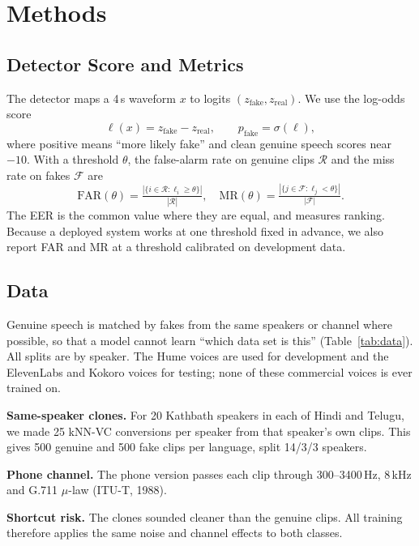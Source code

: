 \documentclass[10pt,a4paper,twocolumn]{article}
\newcommand{\llr}{\ell}
\begin{document}
\section{Methods}
\subsection{Detector Score and Metrics}
The detector maps a 4\,s waveform $x$ to logits $(z_{\text{fake}},z_{\text{real}})$. We use the log-odds score
\begin{equation}
\llr(x)=z_{\text{fake}}-z_{\text{real}},\qquad p_{\text{fake}}=\sigma(\llr),
\label{eq:llr}
\end{equation}
where positive means ``more likely fake'' and clean genuine speech scores near $-10$. With a threshold $\theta$, the false-alarm rate on genuine clips $\mathcal{R}$ and the miss rate on fakes $\mathcal{F}$ are
\begin{equation}
\mathrm{FAR}(\theta)=\tfrac{|\{i\in\mathcal{R}:\llr_i\geq\theta\}|}{|\mathcal{R}|},\quad
\mathrm{MR}(\theta)=\tfrac{|\{j\in\mathcal{F}:\llr_j<\theta\}|}{|\mathcal{F}|}.
\label{eq:far}
\end{equation}
The EER is the common value where they are equal, and measures ranking. Because a deployed system works at one threshold fixed in advance, we also report FAR and MR at a threshold calibrated on development data.

\subsection{Data}
Genuine speech is matched by fakes from the same speakers or channel where possible, so that a model cannot learn ``which data set is this'' (Table~\ref{tab:data}). All splits are by speaker. The Hume voices are used for development and the ElevenLabs and Kokoro voices for testing; none of these commercial voices is ever trained on.

\textbf{Same-speaker clones.} For 20 Kathbath speakers in each of Hindi and Telugu, we made 25 kNN-VC conversions per speaker from that speaker's own clips. This gives 500 genuine and 500 fake clips per language, split 14/3/3 speakers.

\textbf{Phone channel.} The phone version passes each clip through 300--3400\,Hz, 8\,kHz and G.711 $\mu$-law (ITU-T, 1988).

\textbf{Shortcut risk.} The clones sounded cleaner than the genuine clips. All training therefore applies the same noise and channel effects to both classes.
\end{document}

